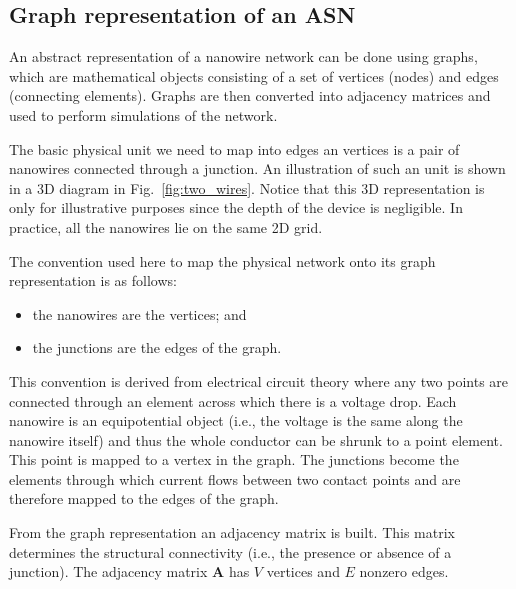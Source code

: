 \documentclass[preprint,10pt, authoryear, a4]{elsarticle}
\begin{document}
\subsection{Graph representation of an ASN}
\label{sec:graph}

An abstract representation of a nanowire network can be done using graphs,
which are mathematical objects consisting of a set of vertices (nodes) and
edges (connecting elements). Graphs are then converted into adjacency matrices
and used to perform simulations of the network.

The basic physical unit we need to map into edges an vertices is a pair of
nanowires connected through a junction. An illustration of such an unit is
shown in a 3D diagram in Fig.~\ref{fig:two_wires}. Notice that this 3D
representation is only for illustrative purposes since the depth of the device
is negligible. In practice, all the nanowires lie on the same 2D grid.

\pagebreak
The
convention used here to map the physical network onto its graph representation
is as follows:
\begin{itemize}
\item the nanowires are the vertices; and 
\item the junctions are the edges of the graph.
\end{itemize}

This convention is derived from electrical circuit theory where any two points
are connected through an element across which there is a voltage drop. Each
nanowire is an equipotential object (i.e., the voltage is the same along the
nanowire itself) and thus the whole conductor can be shrunk to a point
element. This point is mapped to a vertex in the graph. The junctions become
the elements through which current flows between two contact points and are
therefore mapped to the edges of the graph.

From the graph representation an adjacency matrix is built. This matrix
determines the structural connectivity (i.e., the presence or absence of a
junction). The adjacency matrix $\mathbf{A}$ has $V$ vertices and $E$ nonzero
edges.

\end{document}
